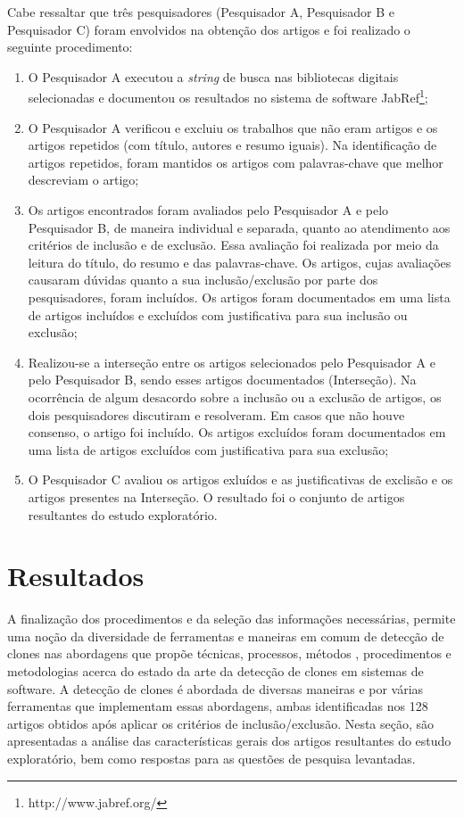Cabe ressaltar que três pesquisadores (Pesquisador A, Pesquisador B e Pesquisador C) foram envolvidos na obtenção dos artigos e foi realizado o seguinte procedimento:

\begin{enumerate}
	\item O Pesquisador A executou a \textit{string} de busca nas bibliotecas digitais selecionadas e documentou os resultados no sistema de software JabRef\footnote{http://www.jabref.org/};
	
	\item O Pesquisador A verificou e excluiu os trabalhos que não eram artigos e os artigos repetidos (com título, autores e resumo iguais). Na identificação de artigos repetidos, foram mantidos os artigos com palavras-chave que melhor descreviam o artigo;
	
	\item Os artigos encontrados foram avaliados pelo Pesquisador A e pelo Pesquisador B, de maneira individual e separada, quanto ao atendimento aos critérios de inclusão e de exclusão. Essa avaliação foi realizada por meio da leitura do título, do resumo e das palavras-chave. Os artigos, cujas avaliações causaram dúvidas quanto a sua inclusão/exclusão por parte dos pesquisadores, foram incluídos. Os artigos foram documentados em uma lista de artigos incluídos e excluídos com justificativa para sua inclusão ou exclusão;
	
	\item Realizou-se a interseção entre os artigos selecionados pelo Pesquisador A e pelo Pesquisador B, sendo esses artigos documentados (Interseção). Na ocorrência de algum desacordo sobre a inclusão ou a exclusão de artigos, os dois pesquisadores discutiram e resolveram. Em casos que não houve consenso, o artigo foi incluído. Os artigos excluídos foram documentados em uma lista de artigos excluídos com justificativa para sua exclusão;
	
	\item O Pesquisador C avaliou os artigos exluídos e as justificativas de exclisão e os artigos presentes na Interseção. O resultado foi o conjunto de artigos resultantes do estudo exploratório.
\end{enumerate}

\section{Resultados}
A finalização dos procedimentos e da seleção das informações necessárias, permite uma noção da diversidade de ferramentas e maneiras em comum de detecção de clones nas abordagens que propõe técnicas, processos, métodos , procedimentos e metodologias   acerca do estado da arte da detecção de clones em sistemas de software. A detecção de clones é abordada de diversas maneiras e por várias ferramentas que implementam essas abordagens, ambas identificadas nos 128 artigos obtidos após aplicar os critérios de inclusão/exclusão. Nesta seção, são apresentadas a análise das características gerais dos artigos resultantes do estudo exploratório, bem como respostas para as questões de pesquisa levantadas.

